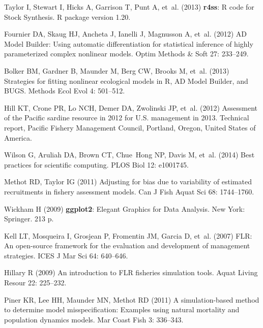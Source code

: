 \documentclass[10pt]{article}
\begin{document}
\begin{thebibliography}{10}
Taylor I, Stewart I, Hicks A, Garrison T, Punt A, et~al. (2013) \textbf{r4ss}:
  \textsf{R} code for Stock Synthesis.
\newblock \textsf{R} package version 1.20.

Fournier DA, Skaug HJ, Ancheta J, Ianelli J, Magnusson A, et~al. (2012) {AD
  Model Builder}: Using automatic differentiation for statistical inference of
  highly parameterized complex nonlinear models.
\newblock Optim Methods \& Soft 27: 233--249.

Bolker BM, Gardner B, Maunder M, Berg CW, Brooks M, et~al. (2013) Strategies
  for fitting nonlinear ecological models in \textsf{R}, {AD Model Builder}, and
  \textsf{BUGS}.
\newblock Methods Ecol Evol 4: 501--512.

Hill KT, Crone PR, Lo NCH, Demer DA, Zwolinski JP, et~al. (2012) Assessment of
  the {Pacific} sardine resource in 2012 for {U.S.} management in 2013.
\newblock Technical report, Pacific Fishery Management Council, Portland, Oregon, United States of America.

Wilson G, Aruliah DA, Brown CT, Chue~Hong NP, Davis M, et~al. (2014) Best
  practices for scientific computing.
\newblock PLOS Biol 12: e1001745.

Methot RD, Taylor IG (2011) Adjusting for bias due to variability of estimated
  recruitments in fishery assessment models.
\newblock Can J Fish Aquat Sci 68: 1744--1760.

Wickham H (2009) \textbf{ggplot2}: Elegant Graphics for Data Analysis.
\newblock New York: Springer. 213 p.

Kell LT, Mosqueira I, Grosjean P, Fromentin JM, Garcia D, et~al. (2007) {FLR}:
  An open-source framework for the evaluation and development of management
  strategies.
\newblock ICES J Mar Sci 64: 640--646.

Hillary R (2009) An introduction to {FLR} fisheries simulation tools.
\newblock Aquat Living Resour 22: 225--232.

Piner KR, Lee HH, Maunder MN, Methot RD (2011) A simulation-based method to
  determine model misspecification: Examples using natural mortality and
  population dynamics models.
\newblock Mar Coast Fish 3: 336--343.


\end{thebibliography}
\end{document}
